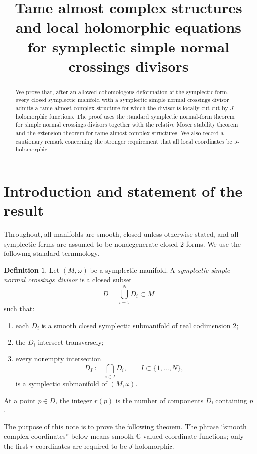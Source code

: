 \documentclass[11pt]{article}
\title{Tame almost complex structures and local holomorphic equations\\ for symplectic simple normal crossings divisors}
\author{}
\date{}
\theoremstyle{definition}
\newtheorem{definition}[theorem]{Definition}
\numberwithin{equation}{section}
\begin{document}
\maketitle

\begin{abstract}
We prove that, after an allowed cohomologous deformation of the symplectic form, every closed symplectic manifold with a symplectic simple normal crossings divisor admits a tame almost complex structure for which the divisor is locally cut out by $J$-holomorphic functions.  The proof uses the standard symplectic normal-form theorem for simple normal crossings divisors together with the relative Moser stability theorem and the extension theorem for tame almost complex structures.  We also record a cautionary remark concerning the stronger requirement that all local coordinates be $J$-holomorphic.
\end{abstract}

\section{Introduction and statement of the result}

Throughout, all manifolds are smooth, closed unless otherwise stated, and all symplectic forms are assumed to be nondegenerate closed $2$-forms.  We use the following standard terminology.

\begin{definition}\label{def:SNC}
Let $(M,\omega)$ be a symplectic manifold.  A \emph{symplectic simple normal crossings divisor} is a closed subset
\[
D=\bigcup_{i=1}^N D_i\subset M
\]
such that:
\begin{enumerate}[label=(\alph*)]
\item each $D_i$ is a smooth closed symplectic submanifold of real codimension $2$;
\item the $D_i$ intersect transversely;
\item every nonempty intersection
\[
D_I:=\bigcap_{i\in I}D_i,\qquad I\subset\{1,\dots,N\},
\]
is a symplectic submanifold of $(M,\omega)$.
\end{enumerate}
At a point $p\in D$, the integer $r(p)$ is the number of components $D_i$ containing $p$.
\end{definition}

The purpose of this note is to prove the following theorem.  The phrase ``smooth complex coordinates'' below means smooth $\mathbb C$-valued coordinate functions; only the first $r$ coordinates are required to be $J$-holomorphic.
\end{document}
